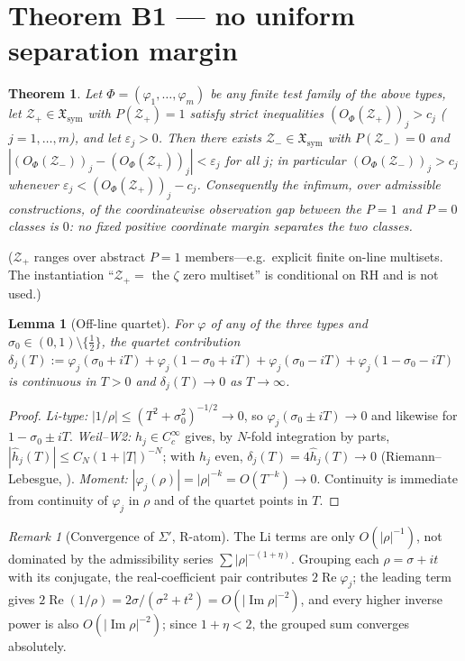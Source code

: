\documentclass[11pt]{article}
\theoremstyle{plain}
\newtheorem{theorem}{Theorem}
\newtheorem{lemma}{Lemma}
\theoremstyle{definition}
\theoremstyle{remark}
\newtheorem*{remark}{Remark}
\newcommand{\Xsym}{\mathfrak{X}_{\mathrm{sym}}}
\newcommand{\Zp}{\mathcal{Z}_+}
\newcommand{\Zm}{\mathcal{Z}_-}
\newcommand{\hhat}{\widehat{h}}
\begin{document}
\section{Theorem B1 --- no uniform separation margin}\label{sec:B1}

\begin{theorem}\label{thm:B1}
Let $\Phi=(\varphi_1,\dots,\varphi_m)$ be any finite test family of the above types, let
$\Zp\in\Xsym$ with $P(\Zp)=1$ satisfy strict inequalities $(O_\Phi(\Zp))_j>c_j$
($j=1,\dots,m$), and let $\varepsilon_j>0$. Then there exists $\Zm\in\Xsym$ with $P(\Zm)=0$ and
$|(O_\Phi(\Zm))_j-(O_\Phi(\Zp))_j|<\varepsilon_j$ for all $j$; in particular
$(O_\Phi(\Zm))_j>c_j$ whenever $\varepsilon_j<(O_\Phi(\Zp))_j-c_j$. Consequently the infimum,
over admissible constructions, of the coordinatewise observation gap between the $P=1$ and
$P=0$ classes is $0$: no fixed positive coordinate margin separates the two classes.
\end{theorem}

\noindent($\Zp$ ranges over abstract $P=1$ members---e.g.\ explicit finite on-line multisets.
The instantiation ``$\Zp=$ the $\zeta$ zero multiset'' is conditional on RH and is not used.)

\begin{lemma}[Off-line quartet]\label{lem:B1}
For $\varphi$ of any of the three types and $\sigma_0\in(0,1)\setminus\{\tfrac12\}$, the
quartet contribution
$\delta_j(T):=\varphi_j(\sigma_0+iT)+\varphi_j(1-\sigma_0+iT)+\varphi_j(\sigma_0-iT)+\varphi_j(1-\sigma_0-iT)$
is continuous in $T>0$ and $\delta_j(T)\to 0$ as $T\to\infty$.
\end{lemma}
\begin{proof}
\emph{Li-type:} $|1/\rho|\le(T^2+\sigma_0^2)^{-1/2}\to 0$, so $\varphi_j(\sigma_0\pm iT)\to 0$
and likewise for $1-\sigma_0\pm iT$. \emph{Weil--W2:} $h_j\in C_c^\infty$ gives, by $N$-fold
integration by parts, $|\hhat_j(T)|\le C_N(1+|T|)^{-N}$; with $h_j$ even,
$\delta_j(T)=4\hhat_j(T)\to 0$ (Riemann--Lebesgue, \cite[Thm.~9.6]{Rudin1987}).
\emph{Moment:} $|\varphi_j(\rho)|=|\rho|^{-k}=O(T^{-k})\to 0$. Continuity is immediate from
continuity of $\varphi_j$ in $\rho$ and of the quartet points in $T$.
\end{proof}

\begin{remark}[Convergence of $\Sigma'$, R-atom]
The Li terms are only $O(|\rho|^{-1})$, not dominated by the admissibility series
$\sum|\rho|^{-(1+\eta)}$. Grouping each $\rho=\sigma+it$ with its conjugate, the
real-coefficient pair contributes $2\operatorname{Re}\varphi_j$; the leading term gives
$2\operatorname{Re}(1/\rho)=2\sigma/(\sigma^2+t^2)=O(|\operatorname{Im}\rho|^{-2})$, and every higher inverse power is also
$O(|\operatorname{Im}\rho|^{-2})$; since $1+\eta<2$, the grouped sum converges absolutely.
\end{remark}
\end{document}
